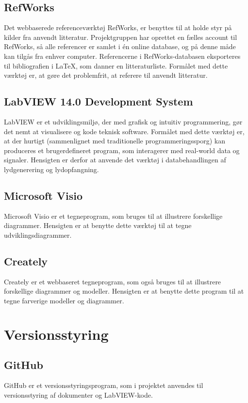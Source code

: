 	\subsection{RefWorks}
Det webbaserede referenceværktøj RefWorks, er benyttes til at holde styr på kilder fra anvendt litteratur. Projektgruppen har oprettet en fælles account til RefWorks, så alle referencer er samlet i én online database, og på denne måde kan tilgås fra enhver computer. Referencerne i RefWorks-databasen eksporteres til bibliografien i LaTeX, som danner en litteraturliste. Formålet med dette værktøj er, at gøre det problemfrit, at referere til anvendt litteratur. 

	\subsection{LabVIEW 14.0 Development System}
	LabVIEW er et udviklingsmiljø, der med grafisk og intuitiv programmering, gør det nemt at visualisere og kode teknisk software. Formålet med dette værktøj er, at der hurtigt (sammenlignet med traditionelle programmeringssporg) kan produceres et brugerdefineret program, som interagerer med real-world data og signaler. Hensigten er derfor at anvende det værktøj i databehandlingen af lydgenerering og lydopfangning. 
	
	\subsection{Microsoft Visio}   
	Microsoft Visio er et tegneprogram, som bruges til at illustrere forskellige diagrammer. Hensigten er at benytte dette værktøj til at tegne udviklingsdiagrammer.
	
	\subsection{Creately}
	Creately er et webbaseret tegneprogram, som også bruges til at illustrere forskellige diagrammer og modeller. Hensigten er at benytte dette program til at tegne farverige modeller og diagrammer. 
	
\section{Versionsstyring}
\subsection{GitHub}
GitHub er et versionsstyringsprogram, som i projektet anvendes til versionsstyring af dokumenter og LabVIEW-kode. 

